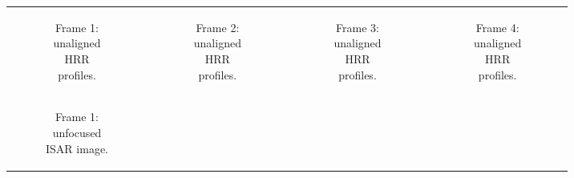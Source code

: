\documentclass[class=report,11pt,crop=false]{standalone}
\begin{document}
    \begin{figure}[H]
        \begin{minipage}{0.9\linewidth}
            \begin{figure}
                \begin{tabular}{@{}cccc@{}}
                    \begin{subfigure}{0.25\linewidth}
                        \centering
                        \resizebox{\linewidth}{!}{}
                        \caption{Frame 1: unaligned HRR profiles. \label{subfig:measured_data_frames_HRRP_2464}}
                    \end{subfigure}
                    &
                    \begin{subfigure}{0.25\linewidth}
                        \centering
                        \resizebox{\linewidth}{!}{}
                        \caption{Frame 2: unaligned HRR profiles.}
                    \end{subfigure}
                    &
                    \begin{subfigure}{0.25\linewidth}
                        \centering
                        \resizebox{\linewidth}{!}{}
                        \caption{Frame 3: unaligned HRR profiles.}
                    \end{subfigure}
                    &
                    \begin{subfigure}{0.25\linewidth}
                        \centering
                        \resizebox{\linewidth}{!}{}
                        \caption{Frame 4: unaligned HRR profiles. \label{subfig:measured_data_frames_HRRP_4189}}
                    \end{subfigure}
                    \\
                    \begin{subfigure}{0.25\linewidth}
                        \centering
                        \resizebox{\linewidth}{!}{}
                        \caption{Frame 1: unfocused ISAR image.}
                    \end{subfigure}
                    &
                    \begin{subfigure}{0.25\linewidth}
                        \centering

\end{subfigure}
\end{tabular}
\end{figure}
\end{minipage}
\end{figure}
\end{document}
